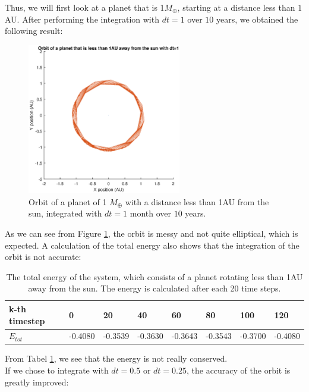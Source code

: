 Thus, we will first look at a planet that is 1$M_{\oplus}$, starting at a distance less than $1$ AU. 
After performing the integration with $dt=1$ over $10$ years, we obtained the following result:
\vspace{-20pt}
\begin{figure}[H]
\centering
\includegraphics[width=0.6\textwidth]{Planeet_1AU_dt1_10jaar.eps}
\caption{Orbit of a planet of 1 $M_{\oplus}$ with a distance less than 1AU from the sun, integrated with $dt=1$ month over $10$ years.}
    \label{fig:Planet1AUdt1}
\end{figure}

As we can see from Figure \ref{fig:Planet1AUdt1}, the orbit is messy and not quite elliptical, which is expected. 
A calculation of the total energy also shows that the integration of the orbit is not accurate:\\

\begin{table}[htb]
\centering
\caption{The total energy of the system, which consists of a planet rotating less than 1AU away from the sun. The energy is calculated after each 20 time steps.}
\begin{tabular}{|l|l|l|l|l|l|l|l|}
\hline
k-th timestep&0&20&40&60&80&100&120\\ \hline
$E_{tot}$&-0.4080& -0.3539&   -0.3630&   -0.3643&   -0.3543&-0.3700&-0.4080\\ \hline
\end{tabular}
\label{tab:Planet1AUEnergy}
\end{table}

From Tabel \ref{tab:Planet1AUEnergy}, we see that the energy is not really conserved.\\

If we chose to integrate with $dt=0.5$ or $dt=0.25$, the accuracy of the orbit is greatly improved:

